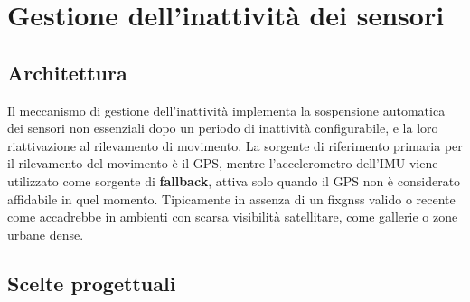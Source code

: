 \newpage

\section{Gestione dell'inattività dei sensori}

\subsection{Architettura}

Il meccanismo di gestione dell'inattività implementa la sospensione automatica dei sensori non essenziali dopo un periodo di
inattività configurabile, e la loro riattivazione al rilevamento di movimento. La sorgente di riferimento primaria per il rilevamento del movimento
è il GPS, mentre l'accelerometro dell'IMU viene utilizzato come sorgente di \textbf{fallback}, attiva solo quando
il GPS non è considerato affidabile in quel momento. Tipicamente in assenza di un \gls{fixgnss} valido o recente come accadrebbe in ambienti con scarsa 
visibilità satellitare, come gallerie o zone urbane dense.
\subsection{Scelte progettuali}


